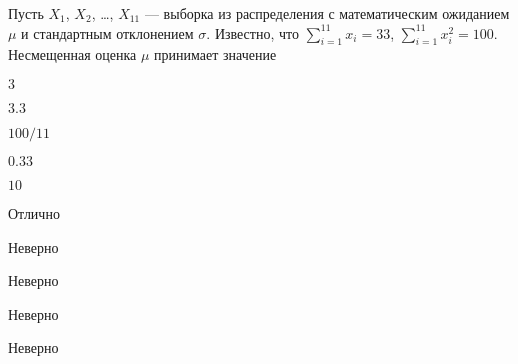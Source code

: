 
\begin{question}
Пусть \(X_1\), \(X_2\), \ldots, \(X_{11}\) --- выборка из распределения
с математическим ожиданием \(\mu\) и стандартным отклонением \(\sigma\).
Известно, что \(\sum_{i=1}^{11}x_i=33\), \(\sum_{i=1}^{11}x_i^2=100\).
Несмещенная оценка \(\mu\) принимает значение
\begin{answerlist}
  \item \(3\)
  \item \(3.3\)
  \item \(100/11\)
  \item \(0.33\)
  \item \(10\)
\end{answerlist}
\end{question}

\begin{solution}
\begin{answerlist}
  \item Отлично
  \item Неверно
  \item Неверно
  \item Неверно
  \item Неверно
\end{answerlist}
\end{solution}

